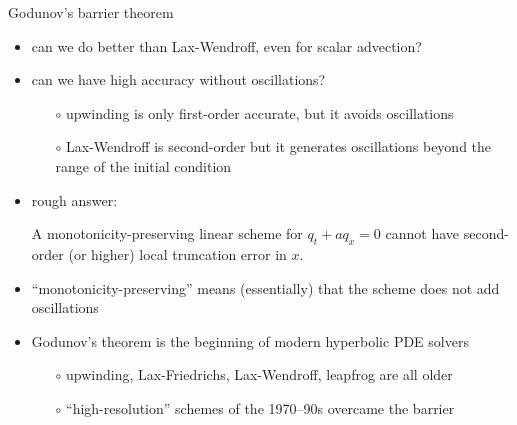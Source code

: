 \documentclass[10pt,dvipsnames,usepdftitle=false,
hyperref={pdftitle = {Finite volume methods},
    pdfauthor = {Ed Bueler}}]{beamer}
\begin{document}
\begin{frame}{Godunov's barrier theorem}

\begin{itemize}
\item can we do better than Lax-Wendroff, even for scalar advection?
\item can we have high accuracy without oscillations?
    \begin{itemize}
    \item[$\circ$] upwinding is only first-order accurate, but it avoids oscillations
    \item[$\circ$] Lax-Wendroff is second-order but it generates oscillations beyond the range of the initial condition
    \end{itemize}
\item rough answer: 

\medskip
\begin{theorem}  A monotonicity-preserving \alert<2>{linear} scheme for $q_t + a q_x=0$ cannot have second-order (or higher) local truncation error in $x$.\end{theorem}

\item ``monotonicity-preserving'' means (essentially) that the scheme does not add oscillations
\item Godunov's theorem is the beginning of modern hyperbolic PDE solvers
    \begin{itemize}
    \item[$\circ$] upwinding, Lax-Friedrichs, Lax-Wendroff, leapfrog are all older
    \item[$\circ$] ``high-resolution'' schemes of the 1970--90s overcame the barrier 
    \end{itemize}
\end{itemize}
\end{frame}
\end{document}

